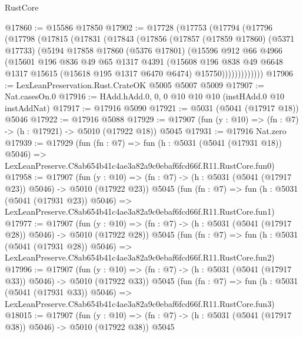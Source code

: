 \begin{lexlean}{RustCore}
\begin{coremodule}
@17860 := @15586 @17850
@17902 := @17728
    (@17753
      (@17794
        (@17796
          (@17798
            (@17815
              (@17831
                (@17843
                  (@17856
                    (@17857
                      (@17859 @17860)
                      (@5371 @17733)
                      (@5194
                        @17858
                        @17860
                        (@5376 @17801)
                        (@15596
                          @912
                          @66
                          @4966
                          (@15601
                            @196
                            @836
                            @49
                            @65
                            @1317
                            @4391
                            (@15608
                              @196
                              @838
                              @49
                              @6648
                              @1317
                              @15615
                              (@15618 @195 @1317 @6470 @6474)
                              @15750)))))))))))))
@17906 := LexLeanPreservation.Rust.CrateOK @5005 @5007 @5009
@17907 := Nat.casesOn.{0}
@17916 := HAdd.hAdd.{0, 0, 0} @10 @10 @10 (instHAdd.{0} @10 instAddNat)
@17917 := @17916 @5090
@17921 := @5031 (@5041 (@17917 @18)) @5046
@17922 := @17916 @5088
@17929 := @17907 (fun (y : @10) => (fn : @7) -> (h : @17921) -> @5010 (@17922 @18)) @5045
@17931 := @17916 Nat.zero
@17939 := @17929
    (fun (fn : @7) =>
    fun (h : @5031 (@5041 (@17931 @18)) @5046) =>
    LexLeanPreserve.C8ab654b41c4ae3a82a9c0ebaf6fcd66f.R11.RustCore.fun0)
@17958 := @17907
    (fun (y : @10) => (fn : @7) -> (h : @5031 (@5041 (@17917 @23)) @5046) -> @5010 (@17922 @23))
    @5045
    (fun (fn : @7) =>
    fun (h : @5031 (@5041 (@17931 @23)) @5046) =>
    LexLeanPreserve.C8ab654b41c4ae3a82a9c0ebaf6fcd66f.R11.RustCore.fun1)
@17977 := @17907
    (fun (y : @10) => (fn : @7) -> (h : @5031 (@5041 (@17917 @28)) @5046) -> @5010 (@17922 @28))
    @5045
    (fun (fn : @7) =>
    fun (h : @5031 (@5041 (@17931 @28)) @5046) =>
    LexLeanPreserve.C8ab654b41c4ae3a82a9c0ebaf6fcd66f.R11.RustCore.fun2)
@17996 := @17907
    (fun (y : @10) => (fn : @7) -> (h : @5031 (@5041 (@17917 @33)) @5046) -> @5010 (@17922 @33))
    @5045
    (fun (fn : @7) =>
    fun (h : @5031 (@5041 (@17931 @33)) @5046) =>
    LexLeanPreserve.C8ab654b41c4ae3a82a9c0ebaf6fcd66f.R11.RustCore.fun3)
@18015 := @17907
    (fun (y : @10) => (fn : @7) -> (h : @5031 (@5041 (@17917 @38)) @5046) -> @5010 (@17922 @38))
    @5045

\end{coremodule}
\end{lexlean}
